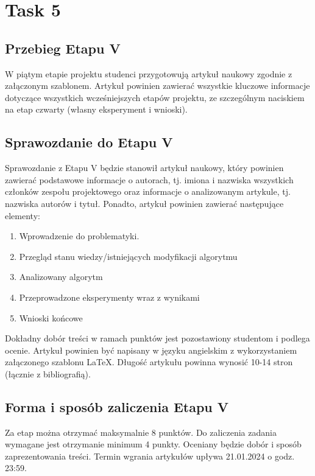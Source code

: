 \documentclass[a4paper,onecolumn]{LTJournalArticle}
\begin{document}
	\section{Task 5}
	\subsection{Przebieg Etapu V}
	W piątym etapie projektu studenci przygotowują artykuł naukowy zgodnie
	z załączonym szablonem.
	Artykuł powinien zawierać wszystkie kluczowe informacje dotyczące
	wszystkich wcześniejszych etapów projektu, ze szczególnym naciskiem na etap
	czwarty (własny eksperyment i wnioski).

	\subsection{Sprawozdanie do Etapu V}
	Sprawozdanie z Etapu V będzie stanowił artykuł naukowy, który powinien
	zawierać podstawowe informacje o autorach, tj. imiona i nazwiska wszystkich
	członków zespołu projektowego oraz informacje o analizowanym artykule, tj.
	nazwiska autorów i tytuł. Ponadto, artykuł powinien zawierać następujące
	elementy:
	\begin{enumerate}
		\item Wprowadzenie do problematyki.
		\item Przegląd stanu wiedzy/istniejących modyfikacji algorytmu
		\item Analizowany algorytm
		\item Przeprowadzone eksperymenty wraz z wynikami
		\item Wnioski końcowe
	\end{enumerate}
	Dokładny dobór treści w ramach punktów jest pozostawiony studentom
	i podlega ocenie.
	Artykuł powinien być napisany w języku angielskim z wykorzystaniem
	załączonego szablonu LaTeX. Długość artykułu powinna wynosić 10-14 stron
	(łącznie z bibliografią).

	\subsection{Forma i sposób zaliczenia Etapu V}
	Za etap można otrzymać maksymalnie 8 punktów. Do zaliczenia zadania
	wymagane jest otrzymanie minimum 4 punkty. Oceniany będzie dobór i sposób
	zaprezentowania treści. Termin wgrania artykułów upływa 21.01.2024 o godz.
	23:59.

	
	\printbibliography %
	
	
\end{document}
